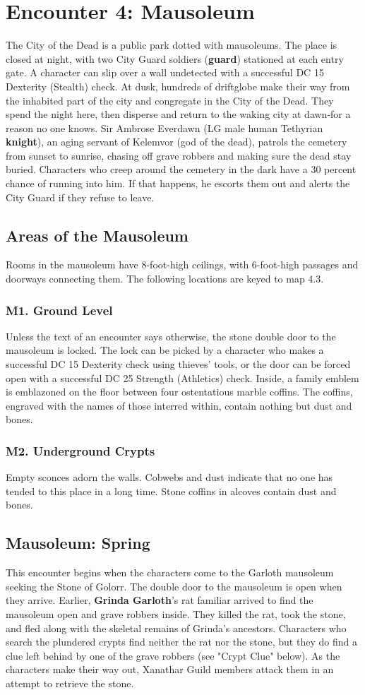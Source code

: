 \documentclass[10pt,a4paper,twoside,twocolumn,openany,nodeprecatedcode]{dndbook}
\begin{document}
\section{Encounter 4: Mausoleum}
The City of the Dead is a public park dotted with mausoleums. The place is closed at night, with two City Guard soldiers (\textbf{guard}) stationed at each entry gate. A character can slip over a wall undetected with a successful DC 15 Dexterity (Stealth) check.
At dusk, hundreds of driftglobe make their way from the inhabited part of the city and congregate in the City of the Dead. They spend the night here, then disperse and return to the waking city at dawn-for a reason no one knows.
Sir Ambrose Everdawn (LG male human Tethyrian \textbf{knight}), an aging servant of Kelemvor (god of the dead), patrols the cemetery from sunset to sunrise, chasing off grave robbers and making sure the dead stay buried. Characters who creep around the cemetery in the dark have a 30 percent chance of running into him. If that happens, he escorts them out and alerts the City Guard if they refuse to leave.
\subsection{Areas of the Mausoleum}
Rooms in the mausoleum have 8-foot-high ceilings, with 6-foot-high passages and doorways connecting them.
The following locations are keyed to map 4.3.
\subsubsection{M1. Ground Level}
Unless the text of an encounter says otherwise, the stone double door to the mausoleum is locked. The lock can be picked by a character who makes a successful DC 15 Dexterity check using thieves' tools, or the door can be forced open with a successful DC 25 Strength (Athletics) check.
Inside, a family emblem is emblazoned on the floor between four ostentatious marble coffins. The coffins, engraved with the names of those interred within, contain nothing but dust and bones.
\subsubsection{M2. Underground Crypts}
Empty sconces adorn the walls. Cobwebs and dust indicate that no one has tended to this place in a long time. Stone coffins in alcoves contain dust and bones.
\subsection{Mausoleum: Spring}
This encounter begins when the characters come to the Garloth mausoleum seeking the Stone of Golorr. The double door to the mausoleum is open when they arrive.
Earlier, \textbf{Grinda Garloth}'s rat familiar arrived to find the mausoleum open and grave robbers inside. They killed the rat, took the stone, and fled along with the skeletal remains of Grinda's ancestors. Characters who search the plundered crypts find neither the rat nor the stone, but they do find a clue left behind by one of the grave robbers (see "Crypt Clue" below). As the characters make their way out, Xanathar Guild members attack them in an attempt to retrieve the stone.
\end{document}
